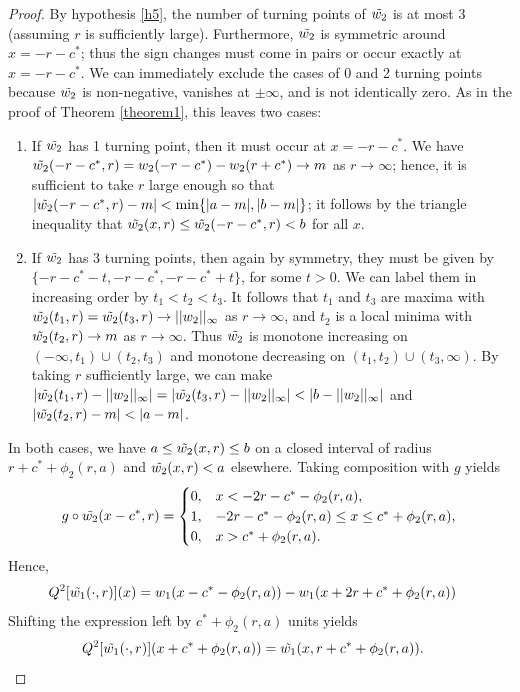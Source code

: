 \documentclass[11pt]{article}
\theoremstyle{definition}
\numberwithin{equation}{section}
\numberwithin{thm}{section}
\renewcommand{\a}{a}
\renewcommand{\b}{b}
\newcommand{\m}{m}
\begin{document}
\begin{proof}
By hypothesis \ref{h5}, the number of turning points of $\tilde{w_2}$ is at most 3 (assuming $r$ is sufficiently large). Furthermore, $\tilde{w_2}$ is symmetric around $x=-r-c^*$; thus the sign changes must come in pairs or occur exactly at $x=-r-c^*$. We can immediately exclude the cases of 0 and 2 turning points because $\tilde{w_2}$ is non-negative, vanishes at $\pm\infty$, and is not identically zero. As in the proof of Theorem \ref{theorem1}, this leaves two cases:
\begin{enumerate}[{Case} 1.]

\item If $\tilde{w_2}$ has 1 turning point, then it must occur at $x=-r-c^*$. We have $\whattwo(-r-c^*,r) = w_2(-r-c^*) - w_2(r+c^*) \to \m$ as $r \to \infty$; hence, it is sufficient to take $r$ large enough so that $|\whattwo(-r-c^*,r) - \m| < \min\{|\a-\m|,|\b-\m|\}$; it follows by the triangle inequality that $\whattwo(x,r) \leq \whattwo(-r-c^*,r) < \b$ for all $x$.

\item If $\tilde{w_2}$ has 3 turning points, then again by symmetry, they must be given by $\{-r-c^*-t, -r-c^*, -r-c^*+t\}$, for some $t>0$. We can label them in increasing order by $t_1<t_2<t_3$. It follows that $t_1$ and $t_3$ are maxima with $\tilde{w_2}(t_1,r)=\tilde{w_2}(t_3,r) \to ||w_2||_\infty$ as $r\to\infty$, and $t_2$ is a local minima with $\whattwo(t_2,r) \to \m$ as $r\to\infty$. Thus $\tilde{w_2}$ is monotone increasing on $(-\infty,t_1)\cup(t_2,t_3)$ and monotone decreasing on $(t_1,t_2)\cup(t_3,\infty)$. By taking $r$ sufficiently large, we can make $\left| \whattwo(t_1,r)-||w_2||_\infty \right| = \left| \whattwo(t_3,r)-||w_2||_\infty \right| < \left| \b-||w_2||_\infty \right| $ and $\left| \whattwo(t_2,r)-\m \right| < \left| \a-\m \right|$.
\end{enumerate}

In both cases, we have $\a \leq \whattwo(x,r) \leq \b$ on a closed interval of radius $r + c^* + \phi_2(r,a)$ and $\tilde{w_2}(x,r) < a$ elsewhere. Taking composition with $g$ yields
$$
g \circ \whattwo(x-c^*,r)  = \begin{cases}
0, & x < -2r - c^* -\phi_2(r,\a), \\
1, & -2r - c^* -\phi_2(r,\a) \leq x \leq  c^* + \phi_2(r,\a) ,\\
0, & x > c^* + \phi_2(r,\a).
\end{cases}
$$
Hence,
$$ \begin{aligned}
Q^2 [\tilde{w_1}(\cdot,r)] (x)  &= w_1(x-c^* - \phi_2(r,a)) - w_1(x+2r+c^*+\phi_2(r,a)) 
\end{aligned} $$
Shifting the expression left by $c^*+\phi_2(r,a)$ units yields
\begin{equation} \begin{aligned} \label{appliedqtwice}
Q^2 [\what(\cdot,r)] (x+c^*+\phi_2(r,a)) 
&=  \what(x, r+c^*+\phi_2(r,\a)).
\end{aligned} \end{equation}


\end{proof}
\end{document}
